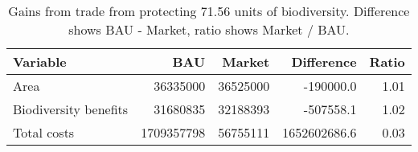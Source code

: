 \begin{table}

\caption{\label{tab:gains-from-trade}Gains from trade from protecting 71.56 units of biodiversity. Difference shows BAU - Market, ratio shows Market / BAU.}
\centering
\begin{tabular}[t]{l|r|r|r|r}
\hline
Variable & BAU & Market & Difference & Ratio\\
\hline
Area & 36335000 & 36525000 & -190000.0 & 1.01\\
\hline
Biodiversity benefits & 31680835 & 32188393 & -507558.1 & 1.02\\
\hline
Total costs & 1709357798 & 56755111 & 1652602686.6 & 0.03\\
\hline
\end{tabular}
\end{table}